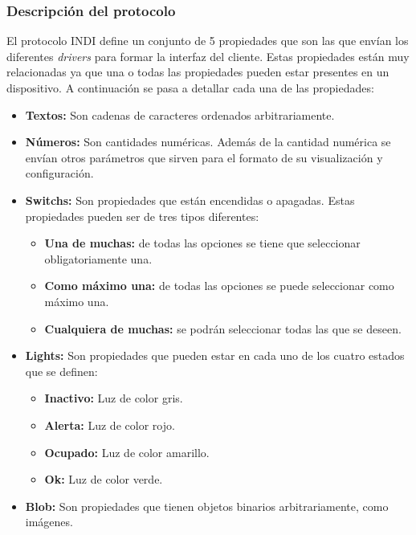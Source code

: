 \subsubsection{Descripción del protocolo}
El protocolo INDI define un conjunto de 5 propiedades que son las que envían los diferentes \textit{drivers} para formar la interfaz del cliente. Estas propiedades están muy relacionadas ya que una o todas las propiedades pueden estar presentes en un dispositivo. A continuación se pasa a detallar cada una de las propiedades:
\begin{itemize}
  \item \textbf{Textos:} Son cadenas de caracteres ordenados arbitrariamente.
  \item \textbf{Números:} Son cantidades numéricas. Además de la cantidad numérica se envían otros parámetros que sirven para el formato de su visualización y configuración.
  \item \textbf{Switchs:} Son propiedades que están encendidas o apagadas. Estas propiedades pueden ser de tres tipos diferentes:
    \begin{itemize}
      \item \textbf{Una de muchas:} de todas las opciones se tiene que seleccionar obligatoriamente una.
	    \item \textbf{Como máximo una:} de todas las opciones se puede seleccionar como máximo una.
	    \item \textbf{Cualquiera de muchas:} se podrán seleccionar todas las que se deseen.
    \end{itemize}
  \item \textbf{Lights:} Son propiedades que pueden estar en cada uno de los cuatro estados que se definen:
    \begin{itemize}
      \item \textbf{Inactivo:} Luz de color gris.
      \item \textbf{Alerta:} Luz de color rojo.
      \item\textbf{Ocupado:} Luz de color amarillo.
      \item \textbf{Ok:} Luz de color verde.
    \end{itemize}
  \item \textbf{Blob:} Son propiedades que tienen objetos binarios arbitrariamente, como imágenes.
\end{itemize}


